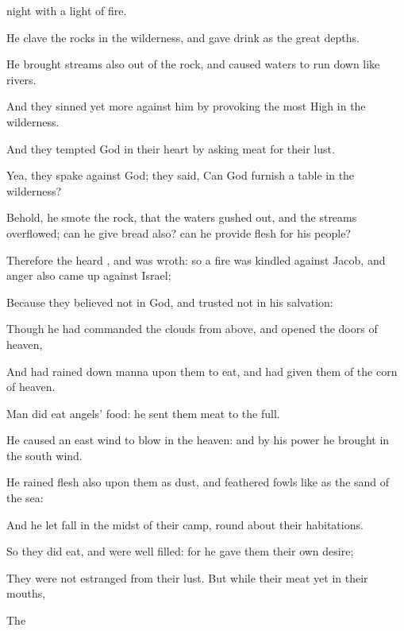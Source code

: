 {night with a
light of
fire.
\par }{\Q {}He
clave the
rocks in the
wilderness, and gave
{}
drink as
{} the
great
depths.
\par }{\Q {}He
brought
streams also out of the
rock, and caused
waters to run
down like
rivers.
\par }{\Q {}And they
sinned yet
more against him by
provoking the most
High in the
wilderness.
\par }{\Q {}And they
tempted
God in their
heart by
asking
meat for their
lust.
\par }{\Q {}Yea, they
spake against
God; they
said,
Can
God
furnish a
table in the
wilderness?
\par }{\Q {}Behold, he
smote the
rock, that the
waters gushed
out, and the
streams
overflowed;
can he
give
bread also?
can he
provide
flesh for his
people?
\par }{\Q {}Therefore the
{}
heard
{}, and was
wroth: so a
fire was
kindled against
Jacob, and
anger also came
up against
Israel;
\par }{\Q {}Because they
believed not in
God, and
trusted not in his
salvation:
\par }{\Q {}Though he had
commanded the
clouds from
above, and
opened the
doors of
heaven,
\par }{\Q {}And had rained
down
manna upon them to
eat, and had
given them of the
corn of
heaven.
\par }{\Q {}Man did
eat
angels’
food: he
sent them
meat to the
full.
\par }{\Q {}He caused an east
wind to
blow in the
heaven: and by his
power he brought
in the south
wind.
\par }{\Q {}He
rained
flesh also upon them as
dust, and
feathered
fowls like as the
sand of the
sea:
\par }{\Q {}And he let
{}
fall in the
midst of their
camp, round
about their
habitations.
\par }{\Q {}So they did
eat, and were
well
filled: for he
gave them their own
desire;
\par }{\Q {}They were not
estranged from their
lust. But while their
meat
{} yet in their
mouths,
\par }{\Q {}The
}
